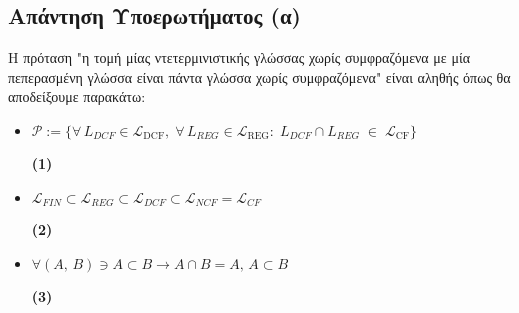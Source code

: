 \subsection{Απάντηση Υποερωτήματος (α)}
\label{ssec:Solution_3.1}
\doublespacing
Η πρόταση "η τομή μίας ντετερμινιστικής γλώσσας χωρίς συμφραζόμενα με μία πεπερασμένη γλώσσα είναι πάντα γλώσσα
χωρίς συμφραζόμενα" είναι αληθής όπως θα αποδείξουμε παρακάτω:


\reducevspace\reducevspace\reducevspace


\begin{tcolorbox}[colback=yellow!15!white, colframe=blue!50!white,
	fonttitle=\bfseries\Large, title = Απόδειξη]
	\centering
\begin{itemize}
	\itemsep0em

	\item $\mathcal{P} := \{\forall\,L_{DCF}\in\mathcal L_{\mathrm{DCF}},\;\forall\,L_{REG}\in\mathcal
	L_{\mathrm{REG}}:\;L_{DCF}\cap L_{REG}\;\in\;\mathcal L_{\mathrm{CF}}\}$
	\reducevspace\reducevspace\reducevspace\reducevspace\reducevspace\reducevspace
	\reducevspace\reducevspace\reducevspace\reducevspace\reducevspace\reducevspace
	\reducevspace\reducevspace\reducevspace\reducevspace\reducevspace\reducevspace
	\reducevspace\reducevspace\reducevspace\reducevspace\reducevspace\reducevspace
	\begin{flushright}\hypertarget{3.1.1}{\bf{(1)}}\end{flushright}


	\item $\mathcal{L}_{FIN} \subset \mathcal{L}_{REG} \subset \mathcal{L}_{DCF} \subset \mathcal{L}_{NCF} =
	\mathcal{L}_{CF}$
	\reducevspace\reducevspace\reducevspace\reducevspace\reducevspace\reducevspace
	\reducevspace\reducevspace\reducevspace\reducevspace\reducevspace\reducevspace
	\reducevspace\reducevspace\reducevspace\reducevspace\reducevspace\reducevspace
	\reducevspace\reducevspace\reducevspace\reducevspace\reducevspace\reducevspace
	\begin{flushright}\hypertarget{3.1.2}{\bf{(2)}}\end{flushright}

	\item $\forall (A,\, B) \ni A \subset B \rightarrow A \cap B = A,\, Α\subset B$
	\reducevspace\reducevspace\reducevspace\reducevspace\reducevspace\reducevspace
	\reducevspace\reducevspace\reducevspace\reducevspace\reducevspace\reducevspace
	\reducevspace\reducevspace\reducevspace\reducevspace\reducevspace\reducevspace
	\reducevspace\reducevspace\reducevspace\reducevspace\reducevspace\reducevspace
	\begin{flushright}\hypertarget{3.1.3}{\bf{(3)}}\end{flushright}


\end{itemize}
\end{tcolorbox}
